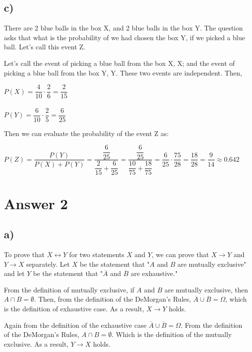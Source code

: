 \documentclass[12pt]{article}
\begin{document}
    
\subsection*{c)}
    There are 2 blue balls in the box X, and 2 blue balls in the box Y. The question asks that what is the probability of we had chosen the box Y, if we picked a blue ball. Let's call this event Z.
    
    Let's call the event of picking a blue ball from the box X, X; and the event of picking a blue ball from the box Y, Y. These two events are independent. Then,
    
    \begin{center}
        $P(X) = \dfrac{4}{10} \cdot \dfrac{2}{6} = \dfrac{2}{15}$ \\
        ~ \\
        $P(Y) = \dfrac{6}{10} \cdot \dfrac{2}{5} = \dfrac{6}{25}$
    \end{center}{}
    
    Then we can evaluate the probability of the event Z as:
    
    \begin{center}
        $P(Z) = \dfrac{P(Y)}{P(X) + P(Y)} = \dfrac{\dfrac{6}{25}}{\dfrac{2}{15} + \dfrac{6}{25}} = \dfrac{\dfrac{6}{25}}{\dfrac{10}{75} + \dfrac{18}{75}} = \dfrac{6}{25} \cdot \dfrac{75}{28} = \dfrac{18}{28} = \dfrac{9}{14} \approx 0.642$
    \end{center}{}

\section*{Answer 2}
\subsection*{a)}
    To prove that $X \leftrightarrow Y$ for two statements $X$ and $Y$, we can prove that $X \rightarrow Y$ and $Y \rightarrow X$ separately. Let $X$ be the statement that "$A$ and $B$ are mutually exclusive" and let $Y$ be the statement that "$\overline{A}$ and $\overline{B}$ are exhaustive."
    
    From the definition of mutually exclusive, if $A$ and $B$ are mutually exclusive, then $A \cap B = \emptyset$. Then, from the definition of the DeMorgan's Rules, $\overline{A} \cup \overline{B} = \Omega$, which is the definition of exhaustive case. As a result, $X \rightarrow Y$ holds.
    
    Again from the definition of the exhaustive case  $\overline{A} \cup \overline{B} = \Omega$. From the definition of the DeMorgan's Rules, $A \cap B = \emptyset$. Which is the definition of the mutually exclusive. As a result, $Y \rightarrow X$ holds.
    
\end{document}
